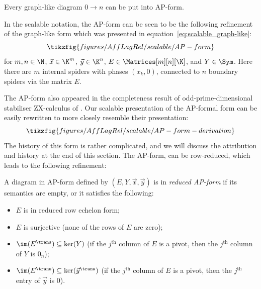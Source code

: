\begin{proposition}
  \label{prop:ap_form}
  Every graph-like diagram \(0 \to n\) can be put into AP-form.
\end{proposition}
\begin{remark}
In the scalable notation, the AP-form  can be seen to be the following refinement of the graph-like form which was presented in equation~\eqref{eq:scalable_graph-like}:
\begin{equation}
  \label{eq:scalable-AP-form}
  \tikzfig{figures/AffLagRel/scalable/AP-form}
\end{equation}
for \(m,n \in \N\), \(\vec{x} \in \K^m\), \(\vec{y} \in \K^n\),
\(E \in\Matrices[m][n][\K]\), and \(Y \in \Sym\). Here
there are \(m\) internal spiders with phases \((x_k,0)\), connected to \(n\)
boundary spiders via the matrix \(E\).
\end{remark}
The AP-form also appeared in the completeness result of odd-prime-dimensional stabiliser ZX-calculus of  \textcite{poor_qupit_2023}. Our scalable presentation of the AP-formal form can be easily rewritten to more closely resemble their presentation:
\begin{equation}
  \label{eq:scalable-AP-form-derivation}
  \tikzfig{figures/AffLagRel/scalable/AP-form-derivation}
\end{equation}
The history of this form is rather complicated, and we will discuss the attribution and history at the end of this section.
The AP-form, can be row-reduced, which leads to the following refinement:
\begin{definition}
  \label{def:reduced_ap_form}
  A diagram in AP-form defined by \((E,Y,\vec{x}, \vec{y})\) is in
  \emph{reduced AP-form} if its semantics are empty, or it satisfies the following:
  \begin{itemize}
    \item \(E\) is in reduced row echelon form;
    \item \(E\) is surjective (none of the rows of  \(E\) are zero);
    \item  \(\im (E^\trans) \subseteq \ker (Y) \) (if the \(j^\text{th}\)  column of \(E\) is a pivot, then the \(j^\text{th}\)  column of \(Y\) is \(0_n\));
    \item  \(\im (E^\trans) \subseteq \ker (\vec{y}^\trans)\) (if the \(j^\text{th}\)  column of \(E\) is a pivot, then the \(j^\text{th}\)  entry of \(\vec y\) is \(0\)).
  \end{itemize}
\end{definition}
